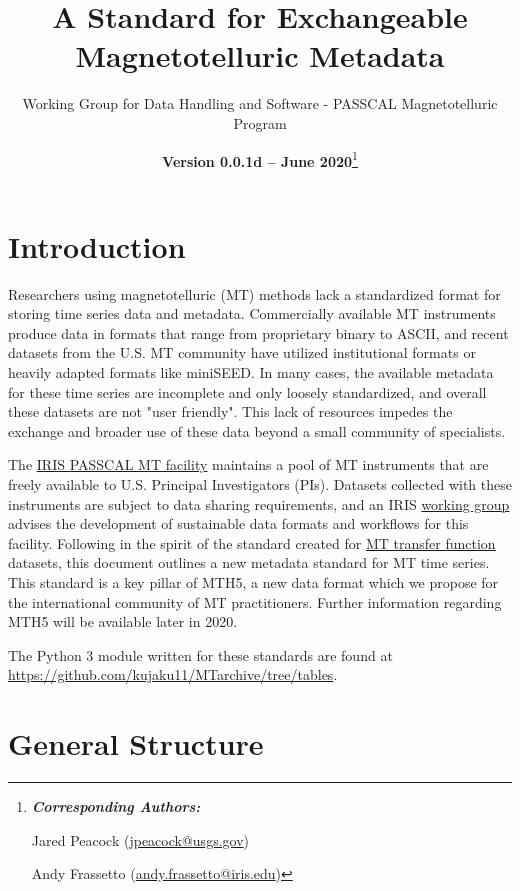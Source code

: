 \documentclass[12pt]{article}
\title{A Standard for Exchangeable Magnetotelluric Metadata}
\date{\textbf{Version 0.0.1d -- June 2020}\footnote{\noindent\textbf{\textit{Corresponding Authors:}}
		
		Jared Peacock (\url{jpeacock@usgs.gov})
		
		Andy Frassetto (\url{andy.frassetto@iris.edu})}}
\author[1]{Working Group for Data Handling and Software - PASSCAL Magnetotelluric Program}
\affil[1]{Portable Array Seismic Studies of the Continental Lithosphere, Incorporated Research Institutions for Seismology}
\begin{document}
	
\maketitle

\tableofcontents
{}
\listoftables
\vspace{1cm}


\newpage

\section{Introduction}

Researchers using magnetotelluric (MT) methods lack a standardized format for storing time series data and metadata. Commercially available MT instruments produce data in formats that range from proprietary binary to ASCII, and recent datasets from the U.S. MT community have utilized institutional formats or heavily adapted formats like miniSEED. In many cases, the available metadata for these time series are incomplete and only loosely standardized, and overall these datasets are not "user friendly". This lack of resources impedes the exchange and broader use of these data beyond a small community of specialists.

The \href{https://www.iris.edu/hq/programs/passcal/magnetotelluricnstrumentation}{IRIS PASSCAL MT facility} maintains a pool of MT instruments that are freely available to U.S. Principal Investigators (PIs). Datasets collected with these instruments are subject to data sharing requirements, and an IRIS \href{https://www.iris.edu/hq/aboutris/governance/mtoft}{working group} advises the development of sustainable data formats and workflows for this facility. Following in the spirit of the standard created for \href{https://library.seg.org/doi/10.1190/geo2018-0679.1}{MT transfer function} datasets, this document outlines a new metadata standard for MT time series. This standard is a key pillar of MTH5, a new data format which we propose for the international community of MT practitioners. Further information regarding MTH5 will be available later in 2020.

The Python 3 module written for these standards are found at \url{https://github.com/kujaku11/MTarchive/tree/tables}.

\section{General Structure}
\end{document}
